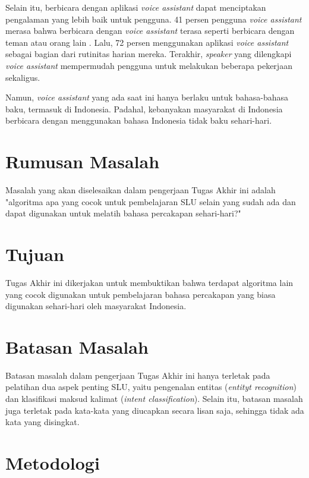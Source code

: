 Selain itu, berbicara dengan aplikasi \textit{voice assistant} dapat menciptakan pengalaman yang lebih baik untuk pengguna. 41 persen pengguna \textit{voice assistant} merasa bahwa berbicara dengan \textit{voice assistant} terasa seperti berbicara dengan teman atau orang lain \parencite{kleinberg2018five}. Lalu, 72 persen menggunakan aplikasi \textit{voice assistant} sebagai bagian dari rutinitas harian mereka. Terakhir, \textit{speaker} yang dilengkapi \textit{voice assistant} mempermudah pengguna untuk melakukan beberapa pekerjaan sekaligus.

Namun, \textit{voice assistant} yang ada saat ini hanya berlaku untuk bahasa-bahasa baku, termasuk di Indonesia. Padahal, kebanyakan masyarakat di Indonesia berbicara dengan menggunakan bahasa Indonesia tidak baku sehari-hari.

\section{Rumusan Masalah}

Masalah yang akan diselesaikan dalam pengerjaan Tugas Akhir ini adalah "algoritma apa yang cocok untuk pembelajaran SLU selain yang sudah ada dan dapat digunakan untuk melatih bahasa percakapan sehari-hari?"

\section{Tujuan}

Tugas Akhir ini dikerjakan untuk membuktikan bahwa terdapat algoritma lain yang cocok digunakan untuk pembelajaran bahasa percakapan yang biasa digunakan sehari-hari oleh masyarakat Indonesia.

\section{Batasan Masalah}

Batasan masalah dalam pengerjaan Tugas Akhir ini hanya terletak pada pelatihan dua aspek penting SLU, yaitu pengenalan entitas (\textit{entityt recognition}) dan klasifikasi maksud kalimat (\textit{intent classification}). Selain itu, batasan masalah juga terletak pada kata-kata yang diucapkan secara lisan saja, sehingga tidak ada kata yang disingkat.

\section{Metodologi}

